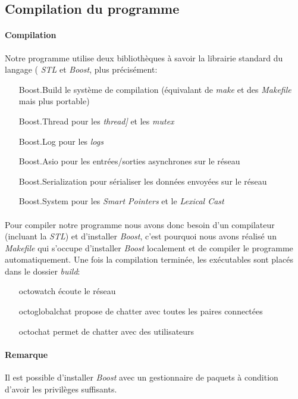 \documentclass[a4paper]{article}
\begin{document}
		\subsection{Compilation du programme}
			\paragraph{Compilation}{
			Notre programme utilise deux bibliothèques à savoir la librairie standard du langage ( \textit{STL} et \textit{Boost}, plus précisément:
			\begin{itemize}
				\item[Boost.Build] le système de compilation (équivalant de \textit{make} et des \textit{Makefile} mais plus portable)
				\item[Boost.Thread] pour les \textit{thread]} et les \textit{mutex}
				\item[Boost.Log] pour les \textit{logs}
				\item[Boost.Asio] pour les entrées/sorties asynchrones sur le réseau
				\item[Boost.Serialization] pour sérialiser les données envoyées sur le réseau
				\item[Boost.System] pour les \textit{Smart Pointers} et le \textit{Lexical Cast}
			\end{itemize}
			}
			\paragraph{}{Pour compiler notre programme nous avons donc besoin d’un compilateur (incluant la \textit{STL}) et d’installer \textit{Boost}, c’est pourquoi nous avons réalisé un \textit{Makefile} qui s’occupe d’installer \textit{Boost} localement et de compiler le programme automatiquement.
			Une fois la compilation terminée, les exécutables sont placés dans le dossier \textit{build}:
			\begin{itemize}
				\item[octowatch] écoute le réseau
				\item[octoglobalchat] propose de chatter avec toutes les paires connectées
				\item[octochat] permet de chatter avec des utilisateurs
			\end{itemize}

			}
			\paragraph{Remarque}{
				Il est possible d’installer \textit{Boost} avec un gestionnaire de paquets à condition d’avoir les privilèges suffisants.
			}
\end{document}
